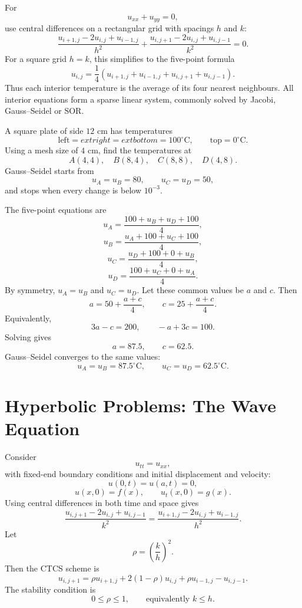 For
\[
 u_{xx}+u_{yy}=0,
\]
use central differences on a rectangular grid with spacings $h$ and $k$:
\[
 \frac{u_{i+1,j}-2u_{i,j}+u_{i-1,j}}{h^2}
 +
 \frac{u_{i,j+1}-2u_{i,j}+u_{i,j-1}}{k^2}=0.
\]
For a square grid $h=k$, this simplifies to the five-point formula
\[
 \boxed{
 u_{i,j}=\frac14
 \left(u_{i+1,j}+u_{i-1,j}+u_{i,j+1}+u_{i,j-1}\right)
 }.
\]
Thus each interior temperature is the average of its four nearest neighbours.  All interior equations form a sparse linear system, commonly solved by Jacobi, Gauss--Seidel or SOR.

\begin{example}
A square plate of side $12$ cm has temperatures
\[
 \text{left}=	ext{right}=	ext{bottom}=100^\circ\mathrm C,
 \qquad
 \text{top}=0^\circ\mathrm C.
\]
Using a mesh size of $4$ cm, find the temperatures at
\[
 A(4,4),\quad B(8,4),\quad C(8,8),\quad D(4,8).
\]
Gauss--Seidel starts from
\[
 u_A=u_B=80,
 \qquad u_C=u_D=50,
\]
and stops when every change is below $10^{-3}$.
\end{example}

\begin{solution}[7.0cm]
The five-point equations are
\[
 u_A=\frac{100+u_B+u_D+100}{4},
\]
\[
 u_B=\frac{u_A+100+u_C+100}{4},
\]
\[
 u_C=\frac{u_D+100+0+u_B}{4},
\]
\[
 u_D=\frac{100+u_C+0+u_A}{4}.
\]
By symmetry, $u_A=u_B$ and $u_C=u_D$.  Let these common values be $a$ and $c$.  Then
\[
 a=50+\frac{a+c}{4},
 \qquad
 c=25+\frac{a+c}{4}.
\]
Equivalently,
\[
 3a-c=200,
 \qquad
 -a+3c=100.
\]
Solving gives
\[
 a=87.5,
 \qquad c=62.5.
\]
Gauss--Seidel converges to the same values:
\[
 u_A=u_B=87.5^\circ\mathrm C,
 \qquad
 u_C=u_D=62.5^\circ\mathrm C.
\]
\end{solution}

\section{Hyperbolic Problems: The Wave Equation}

Consider
\[
 u_{tt}=u_{xx},
\]
with fixed-end boundary conditions and initial displacement and velocity:
\[
 u(0,t)=u(a,t)=0,
\]
\[
 u(x,0)=f(x),
 \qquad
 u_t(x,0)=g(x).
\]
Using central differences in both time and space gives
\[
 \frac{u_{i,j+1}-2u_{i,j}+u_{i,j-1}}{k^2}
 =
 \frac{u_{i+1,j}-2u_{i,j}+u_{i-1,j}}{h^2}.
\]
Let
\[
 \rho=\left(\frac{k}{h}\right)^2.
\]
Then the CTCS scheme is
\[
 \boxed{
 u_{i,j+1}
 =\rho u_{i+1,j}+2(1-\rho)u_{i,j}
 +\rho u_{i-1,j}-u_{i,j-1}
 }.
\]
The stability condition is
\[
 0\le\rho\le1,
 \qquad\text{equivalently }k\le h.
\]

